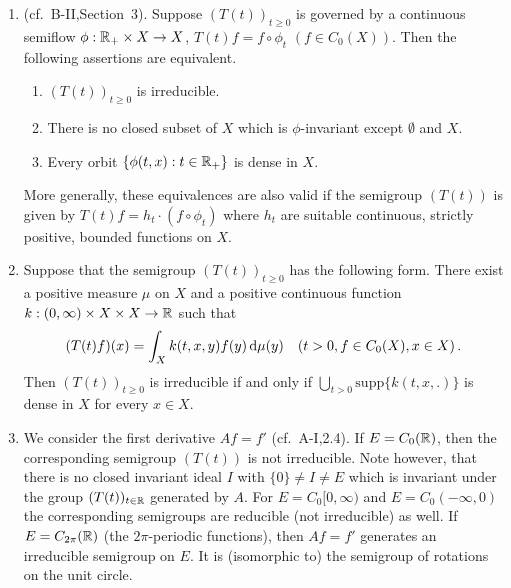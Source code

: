 \begin{examples}\label{ex:b3-3.4}
%
	
\begin{enumerate}[\upshape (i), wide, labelindent=.5em]
	\item 
	(cf.\ B-II,Section~3). Suppose $(T(t))_{t\geq 0}$ is governed by a continuous semiflow $\phi : \mathbb{R}_{+} \times X \to X$, \ie $T(t)f = f\circ\phi_{t}$ $(f\in C_{0}(X))$.
	Then the following assertions are equivalent.
	\begin{enumerate}[\upshape (a)]
		\item 
		$(T(t))_{t\geq 0}$ is irreducible.
	
		\item 
		There is no closed subset of $X$ which is $\phi$-invariant except $\emptyset$ and $X$.
	
		\item 
		Every orbit $\{\phi(t,x) : t \in \mathbb{R}_{+}\}$ is dense in $X$.
	\end{enumerate}
	More generally, these equivalences are also valid if the semigroup $(T(t))$ is given by $T(t)f = h_{t}\cdot(f\circ\phi_{t})$ where $h_{t}$ are suitable continuous, strictly positive, bounded functions on $X$.
	
	\item 
	Suppose that the semigroup $(T(t))_{t\geq 0}$ has the following form. 
    There exist a positive measure $\mu$ on $X$ and a positive continuous function $k : (0,\infty) \times X \times X \to \mathbb{R}$ such that
	\begin{equation}\label{eq:b3-3.1}
		(T(t)f)(x) = \int_{X} k(t,x,y)f(y) \mathop{}\!\mathrm{d}{\mu}(y) \quad (t > 0, f \in C_{0}(X), x \in X)\,.		
	\end{equation}	
	Then $(T(t))_{t\geq 0}$ is irreducible if and only if $\bigcup_{t>0}\text{supp}\{k(t,x,.)\}$ is dense in $X$ for every $x \in X$.
	
	\item 
	We consider the first derivative $Af = f'$ (cf.\ A-I,2.4). 
    If $E = C_{0}(\mathbb{R})$, then the corresponding semigroup $(T(t))$ is not irreducible.
	Note however, that there is no closed invariant ideal $I$ with $\{0\} \neq I \neq E$ which is invariant under the group $(T(t))_{t\in\mathbb{R}}$ generated by $A$.
	For $E = C_{0}[0,\infty)$ and $E = C_{0}(-\infty,0)$ the corresponding semigroups are reducible (\ie not irreducible) as well.
	If $E = C_{2\pi}(\mathbb{R})$ (\ie the $2\pi$-periodic functions), then $Af = f'$ generates an irreducible semigroup on $E$.
	It is (isomorphic to) the semigroup of rotations on the unit circle.
    

\end{enumerate}
\end{examples}
